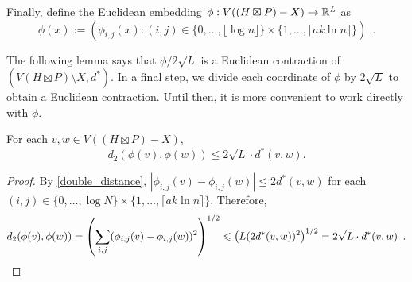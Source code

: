 \documentclass{patmorin}
\renewcommand{\le}{\leqslant}
\begin{document}
Finally, define the Euclidean embedding $\phi:V((H\boxtimes P)-X)\to\mathbb{R}^L$ as
\[
   \phi(x) := \left(\phi_{i,j}(x):(i,j)\in \{0,\ldots,\lfloor \log n\rfloor\}\times\{1,\ldots,\lceil a k\ln n\rceil\}\right) \enspace .
\]


The following lemma says that $\phi/2\sqrt{L}$ is a Euclidean contraction of $(V(H\boxtimes P)\setminus X,d^*)$.  In a final step, we divide each coordinate of $\phi$ by $2\sqrt{L}$ to obtain a Euclidean contraction. Until then, it is more convenient to work directly with $\phi$.

\begin{clm}\label{euclidean_contraction}
  For each $v,w\in V((H\boxtimes P)-X)$, $$d_2(\phi(v),\phi(w)) \le 2\sqrt{L}\cdot d^*(v,w).$$
\end{clm}

\begin{proof}
  By \cref{double_distance}, $|\phi_{i,j}(v)-\phi_{i,j}(w)|\le 2d^*(v,w)$ for each $(i,j)\in\{0,\ldots,\log N\}\times\{1,\ldots,\lceil ak\ln n\rceil\}$.  Therefore,
  \[
    d_2(\phi(v),\phi(w)) = \left(\sum_{i,j}(\phi_{i,j}(v)-\phi_{i,j}(w))^2\right)^{1/2}
    \le \left(L (2d^*(v,w))^2\right)^{1/2} = 2\sqrt{L}\cdot d^*(v,w) \enspace . \qedhere
  \]
\end{proof}



\end{document}
